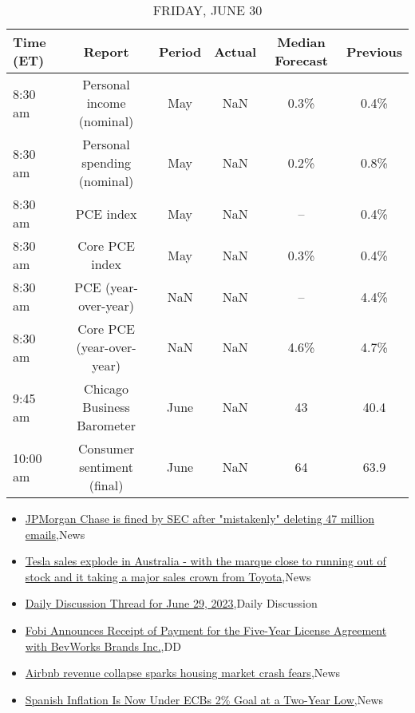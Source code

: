 \documentclass{article}%
\begin{document}
\begin{table}[htbp]%
\caption{FRIDAY, JUNE 30}%
\centering%
\begin{adjustbox}{width=1\textwidth}%
\begin{tabular}{lccccc}
\toprule
Time (ET) &                      Report & Period & Actual & Median Forecast & Previous \\
\midrule
  8:30 am &   Personal income (nominal) &    May &    NaN &            0.3\% &     0.4\% \\
  8:30 am & Personal spending (nominal) &    May &    NaN &            0.2\% &     0.8\% \\
  8:30 am &                   PCE index &    May &    NaN &              -- &     0.4\% \\
  8:30 am &              Core PCE index &    May &    NaN &            0.3\% &     0.4\% \\
  8:30 am &        PCE (year-over-year) &    NaN &    NaN &              -- &     4.4\% \\
  8:30 am &   Core PCE (year-over-year) &    NaN &    NaN &            4.6\% &     4.7\% \\
  9:45 am &  Chicago Business Barometer &   June &    NaN &              43 &     40.4 \\
 10:00 am &  Consumer sentiment (final) &   June &    NaN &              64 &     63.9 \\
\bottomrule
\end{tabular}
%
\end{adjustbox}%
\end{table}

%
\begin{itemize}%
\item%
\href{https://reddit.com/r/wallstreetbets/comments/14m2ldt/jpmorgan\_chase\_is\_fined\_by\_sec\_after\_mistakenly/}{JPMorgan Chase is fined by SEC after "mistakenly" deleting 47 million emails},News%
\item%
\href{https://reddit.com/r/wallstreetbets/comments/14m2jy8/tesla\_sales\_explode\_in\_australia\_with\_the\_marque/}{Tesla sales explode in Australia - with the marque close to running out of stock and it taking a major sales crown from Toyota},News%
\item%
\href{https://reddit.com/r/wallstreetbets/comments/14m0xfo/daily\_discussion\_thread\_for\_june\_29\_2023/}{Daily Discussion Thread for June 29, 2023},Daily Discussion%
\item%
\href{https://reddit.com/r/Baystreetbets/comments/14lcusn/fobi\_announces\_receipt\_of\_payment\_for\_the/}{Fobi Announces Receipt of Payment for the Five-Year License Agreement with BevWorks Brands Inc.},DD%
\item%
\href{https://reddit.com/r/Economics/comments/14m1lon/airbnb\_revenue\_collapse\_sparks\_housing\_market/}{Airbnb revenue collapse sparks housing market crash fears},News%
\item%
\href{https://reddit.com/r/Economics/comments/14m0q5h/spanish\_inflation\_is\_now\_under\_ecbs\_2\_goal\_at\_a/}{Spanish Inflation Is Now Under ECBs 2\% Goal at a Two-Year Low},News%
\end{itemize}%
\end{document}
